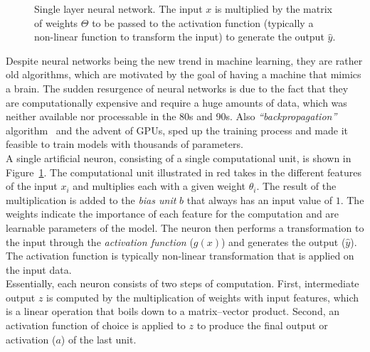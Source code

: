 \begin{figure}
\centering 
\resizebox{0.65\textwidth}{0.35\textwidth}{      

}
\caption{Single layer neural network. The input $x$ is multiplied by the matrix of weights $\Theta$ to be passed to the activation function (typically a non-linear function to transform the input) to generate the output $\hat { y }$. \protect \footnotemark}
\label{fig:preceptron}
\end{figure}
\noindent
Despite neural networks being the new trend in machine learning, they are rather old algorithms, which are motivated by the goal of having a machine that mimics a brain. The sudden resurgence of neural networks is due to the fact that they are computationally expensive and require a huge amounts of data, which was neither available nor processable in the 80s and 90s. Also \emph{``backpropagation''} algorithm~ and the advent of GPUs, sped up the training process and made it feasible to train models with thousands of parameters.\\
A single artificial neuron, consisting of a single computational unit, is shown in Figure~\ref{fig:preceptron}. The computational unit illustrated in red takes in the different features of the input $x_i$ and multiplies each with a given weight $\theta_i$. The result of the multiplication is added to the \emph{bias unit} $b$ that always has an input value of $1$.
The weights indicate the importance of each feature for the computation and are learnable parameters of the model. The neuron then performs a transformation to the input through the \emph{activation function} ($g(x)$) and generates the output ($\hat { y } $). The activation function is typically non-linear transformation that is applied on the input data.\\
Essentially, each neuron consists of two steps of computation. First, intermediate output $z$ is computed by the multiplication of weights with input features, which is a linear operation that boils down to a matrix--vector product.
Second, an activation function of choice is applied to $z$ to produce the final output or activation ($a$) of the last unit. \\
